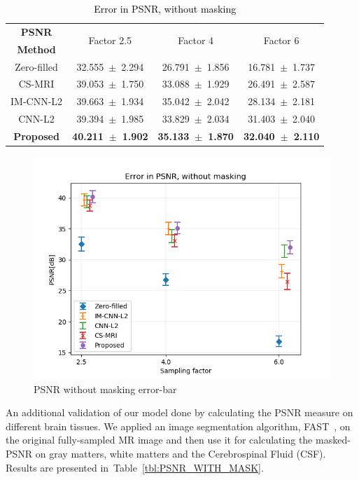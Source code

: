 \documentclass[review]{elsarticle}
\begin{document}
\begin{table}[H]
	\centering{}
	\begin{tabular}{|c||c||c||c|}
		\hline 
		\textbf{PSNR} & \multicolumn{1}{c||}{\multirow{2}{*}{Factor 2.5}} & \multicolumn{1}{c||}{\multirow{2}{*}{Factor 4}} & \multicolumn{1}{c|}{\multirow{2}{*}{Factor 6}} \tabularnewline
		\textbf{Method} & \multicolumn{1}{c||}{} & \multicolumn{1}{c||}{} & \multicolumn{1}{c|}{} \tabularnewline \cline{1-4}
		
		Zero-filled         &32.555~$\pm$~2.294  &26.791~$\pm$~1.856 &16.781~$\pm$~1.737\tabularnewline
		CS-MRI              &39.053~$\pm$~1.750  &33.088~$\pm$~1.929 &26.491~$\pm$~2.587\tabularnewline
		IM-CNN-L2           &39.663~$\pm$~1.934  &35.042~$\pm$~2.042 &28.134~$\pm$~2.181\tabularnewline
		CNN-L2              &39.394~$\pm$~1.985  &33.829~$\pm$~2.034 &31.403~$\pm$~2.040\tabularnewline
		\textbf{Proposed}   &\textbf{40.211~$\pm$~1.902}  &\textbf{35.133~$\pm$~1.870}   &\textbf{32.040~$\pm$~2.110}\tabularnewline
		\hline 
	\end{tabular}\caption{\textcolor{black}{\footnotesize{}{}Error in PSNR, without masking}{\footnotesize{}\label{tbl:PSNR_NO_MASK}}}
\end{table}



\begin{figure}[H]
\centering
\includegraphics[width=0.7\linewidth]{include/grp2/error_psnr_errorbar}
\caption{PSNR without masking error-bar}
\end{figure}\label{fig:error_psnr_errorbar}

An additional validation of our model done by calculating the PSNR measure on different brain tissues. We applied an image segmentation algorithm, FAST~\cite{zhang2001segmentation}, on the original fully-sampled MR image and then use it for calculating the masked-PSNR on gray matters, white matters and the Cerebrospinal Fluid (CSF). Results are presented in~Table~\ref{tbl:PSNR_WITH_MASK}.
\end{document}

